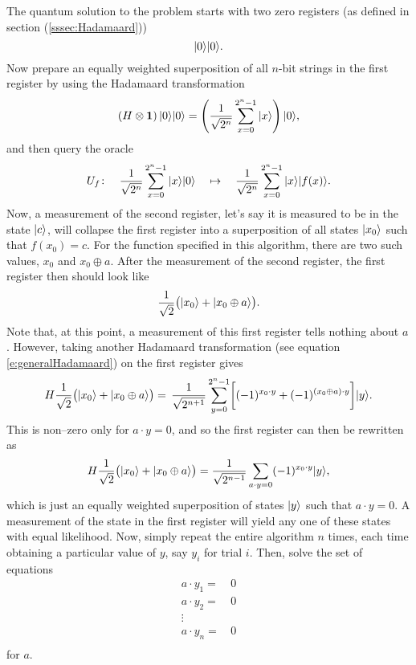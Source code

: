 The quantum solution to the problem starts with two zero registers
(as defined in section (\ref{sssec:Hadamaard}))
\begin{equation}
{|{0}\rangle}{|{0}\rangle}.
\end{equation}
Now prepare an equally weighted superposition of all $n$-bit strings
in the first register by using the Hadamaard transformation
\begin{equation}
\left(H\otimes\bf{1}\right){|{0}\rangle}{|{0}\rangle} =
\left(\frac{1}{\sqrt{2^n}}\sum_{x=0}^{2^n-1}{|{x}\rangle}\right){|{0}\rangle},
\end{equation}
and then query the oracle
\begin{equation}
U_f\colon\quad
\frac{1}{\sqrt{2^n}}\sum_{x=0}^{2^n-1}{|{x}\rangle}{|{0}\rangle}\quad\mapsto\quad
\frac{1}{\sqrt{2^n}}\sum_{x=0}^{2^n-1}{|{x}\rangle}{|{f(x)}\rangle}.
\end{equation}
Now, a measurement of the second register, let's say it is measured
to be in the state ${|{c}\rangle}$,
will collapse the first register into a superposition of all 
states ${|{x_0}\rangle}$ such that $f(x_0)=c$.  
For the function specified in this algorithm, 
there are two such values, $x_0$ and $x_0\oplus a$.
After the measurement of the second register, 
the first register then should look like 
\begin{equation}
\frac{1}{\sqrt{2}}\bigl({|{x_0}\rangle}+{|{x_0\oplus a}\rangle}\bigr).
\end{equation}
Note that, at this point, a measurement of this first register tells
nothing about $a$.  However, taking another Hadamaard transformation 
(see equation \ref{e:generalHadamaard})
on the first register gives 
\begin{equation}
H \frac{1}{\sqrt{2}}\bigl({|{x_0}\rangle}+{|{x_0\oplus a}\rangle}\bigr)=
\,\frac{1}{\sqrt{2^{n+1}}}\sum_{y=0}^{2^n-1}
\biggl[(-1)^{x_0\cdot y}+(-1)^{(x_0\oplus a)\cdot y}\biggr]{|{y}\rangle}.
\end{equation}
This is non--zero only for $a\cdot y=0$, and so the first register
can then be rewritten as
\begin{equation}
H \frac{1}{\sqrt{2}}\bigl({|{x_0}\rangle}+{|{x_0\oplus a}\rangle}\bigr)
=\frac{1}{\sqrt{2^{n-1}}}\sum_{a\cdot y=0}
(-1)^{x_0\cdot y}{|{y}\rangle},
\end{equation}
which is just an equally weighted superposition of states
${|{y}\rangle}$ such that $a\cdot y = 0$.
A measurement of the state in the first register will yield
any one of these states with equal likelihood.  Now, simply
repeat the entire algorithm $n$ times, each time obtaining
a particular value of $y$, say $y_i$ for trial $i$.
Then, solve the set of equations
\begin{equation}
\begin{split}
a\cdot y_1 =&\, 0\\
a\cdot y_2 =&\, 0\\
\vdots\quad&\\
a\cdot y_n =&\, 0\\
\end{split}
\end{equation}
for $a$.

